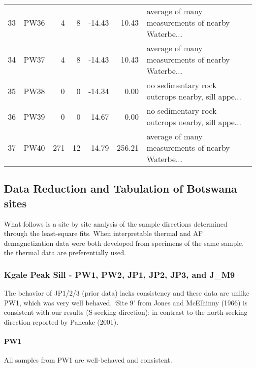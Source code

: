 \documentclass{article}
\begin{document}
{\begin{tabular}{llrrrrl}
33 &    PW36 &        4 &    8 &   -14.43 &        10.43 &  average of many measurements of nearby Waterbe... \\
34 &    PW37 &        4 &    8 &   -14.43 &        10.43 &  average of many measurements of nearby Waterbe... \\
35 &    PW38 &        0 &    0 &   -14.34 &         0.00 &  no sedimentary rock outcrops nearby, sill appe... \\
36 &    PW39 &        0 &    0 &   -14.67 &         0.00 &  no sedimentary rock outcrops nearby, sill appe... \\
37 &    PW40 &      271 &   12 &   -14.79 &       256.21 &  average of many measurements of nearby Waterbe... \\
\bottomrule
\end{tabular}
}

    

    \subsection{Data Reduction and Tabulation of Botswana
sites}\label{data-reduction-and-tabulation-of-botswana-sites}

    What follows is a site by site analysis of the sample directions
determined through the least-square fits. When interpretable thermal and
AF demagnetization data were both developed from specimens of the same
sample, the thermal data are preferentially used.

    \subsubsection{Kgale Peak Sill - PW1, PW2, JP1, JP2, JP3, and
J\_M9}\label{kgale-peak-sill---pw1-pw2-jp1-jp2-jp3-and-jux5fm9}

The behavior of JP1/2/3 (prior data) lacks consistency and these data
are unlike PW1, which was very well behaved. `Site 9' from Jones and
McElhinny (1966) is consistent with our results (S-seeking direction);
in contrast to the north-seeking direction reported by Pancake (2001).

\paragraph{PW1}\label{pw1}

All samples from PW1 are well-behaved and consistent.
\end{document}
